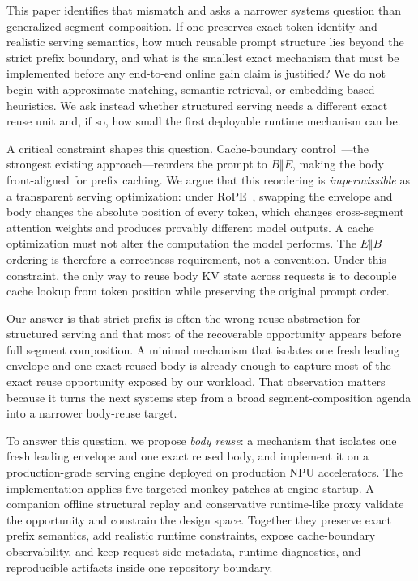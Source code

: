 \documentclass[conference]{IEEEtran}
\begin{document}
This paper identifies that mismatch and asks a narrower systems question than generalized segment composition. If one preserves exact token identity and realistic serving semantics, how much reusable prompt structure lies beyond the strict prefix boundary, and what is the smallest exact mechanism that must be implemented before any end-to-end online gain claim is justified? We do not begin with approximate matching, semantic retrieval, or embedding-based heuristics. We ask instead whether structured serving needs a different exact reuse unit and, if so, how small the first deployable runtime mechanism can be.

A critical constraint shapes this question. Cache-boundary control~\cite{lumer2026dontbreak}---the strongest existing approach---reorders the prompt to $B \Vert E$, making the body front-aligned for prefix caching. We argue that this reordering is \emph{impermissible} as a transparent serving optimization: under RoPE~\cite{su2021roformer}, swapping the envelope and body changes the absolute position of every token, which changes cross-segment attention weights and produces provably different model outputs. A cache optimization must not alter the computation the model performs. The $E \Vert B$ ordering is therefore a correctness requirement, not a convention. Under this constraint, the only way to reuse body KV state across requests is to decouple cache lookup from token position while preserving the original prompt order.

Our answer is that strict prefix is often the wrong reuse abstraction for structured serving and that most of the recoverable opportunity appears before full segment composition. A minimal mechanism that isolates one fresh leading envelope and one exact reused body is already enough to capture most of the exact reuse opportunity exposed by our workload. That observation matters because it turns the next systems step from a broad segment-composition agenda into a narrower body-reuse target.

To answer this question, we propose \emph{body reuse}: a mechanism that isolates one fresh leading envelope and one exact reused body, and implement it on a production-grade serving engine deployed on production NPU accelerators. The implementation applies five targeted monkey-patches at engine startup. A companion offline structural replay and conservative runtime-like proxy validate the opportunity and constrain the design space. Together they preserve exact prefix semantics, add realistic runtime constraints, expose cache-boundary observability, and keep request-side metadata, runtime diagnostics, and reproducible artifacts inside one repository boundary.
\end{document}
